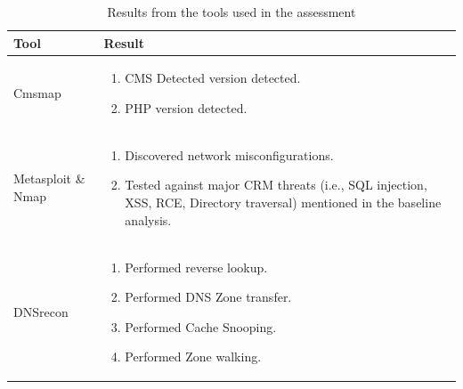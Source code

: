 \newpage
\begingroup
\centering
\setlength{\tabcolsep}{6.5pt} %
\renewcommand{\arraystretch}{1.8} %
\begin{longtable}{ |p{5cm}| p{10cm} |}
\caption{Results from the tools used in the assessment}
    \label{table:spoofing}
\hline
\rowcolor{grey!15}
\textbf{Tool}  & \textbf{Result}\\
\hline
Cmsmap &  \begin{enumerate}
    \item CMS Detected version detected.
    \item PHP version detected.
\end{enumerate}\\
\hline
Metasploit \& Nmap &  \begin{enumerate}
    \item Discovered network misconfigurations.
    \item Tested against major CRM threats (i.e., SQL injection, XSS, RCE, Directory traversal) mentioned in the baseline analysis.
\end{enumerate}\\
\hline
DNSrecon &  \begin{enumerate}
    \item Performed reverse lookup.
    \item Performed DNS Zone transfer.
    \item Performed Cache Snooping.
    \item Performed Zone walking.
\end{enumerate}\\
\hline
\end{longtable}
\endgroup